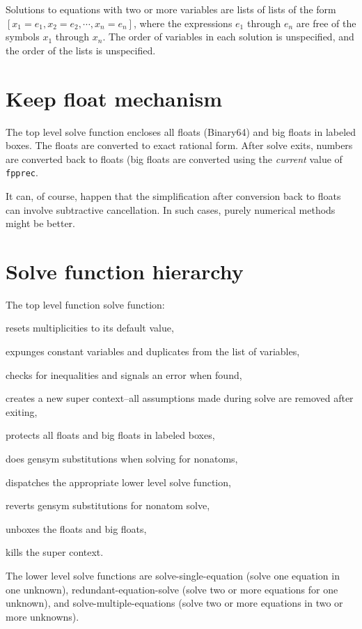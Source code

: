 \documentclass[]{scrartcl}
\newcommand{\fpprec}{\texttt{fpprec}}
\begin{document}
Solutions to equations with two or more variables are lists of lists of the form \([x_1 = e_1, x_2 = e_2,
\cdots, x_n = e_n] \), where the expressions \(e_1\) through \(e_n\) are free of the symbols \(x_1\)
through \(x_n \). The order of variables in each solution is unspecified, and the order of the lists is
unspecified.

\section{Keep float mechanism}

The top level solve function encloses all floats (Binary64) and big floats in labeled boxes.
The floats are converted to exact rational form. After solve exits, numbers are converted back
to floats (big floats are converted using the \emph{current} value of \fpprec.

It can, of course, happen that the simplification after conversion back to floats can
involve subtractive cancellation. In such cases, purely numerical methods might be better.

\section{Solve function hierarchy}

 The top level function solve function:
 \begin{alphalist}[]
   \item resets multiplicities to its default value,
   \item expunges constant variables and duplicates from the list of variables,
   \item checks for inequalities and signals an error when found,
   \item creates a new super context--all assumptions made during solve are removed after exiting,
   \item protects all floats and big floats in labeled boxes,
   \item does gensym substitutions when solving for nonatoms,
   \item dispatches the appropriate lower level solve function,
   \item reverts gensym substitutions for nonatom solve,
   \item unboxes the floats and big floats,
   \item kills the super context.
\end{alphalist}

The lower level solve functions are solve-single-equation (solve one equation in one unknown),
redundant-equation-solve (solve two or more equations for one unknown), and solve-multiple-equations
(solve two or more equations in two or more unknowns).
\end{document}
